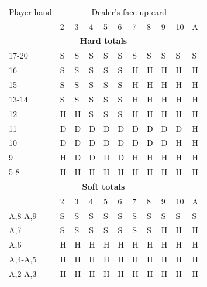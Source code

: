 \documentclass[conference]{IEEEtran}
\begin{document}
\begin{table}[ht]
\tiny
\centering
\begin{tabular}{|l|l|l|l|l|l|l|l|l|l|l|}
\hline

{Player hand} & \multicolumn{10}{c|}{Dealer's face-up card}     \\ \cline{2-11} 
                             & 2 & 3 & 4 & 5 & 6 & 7 & 8 & 9 & 10 & A \\ \hline
\multicolumn{11}{|c|}{\textbf{Hard totals}}                           \\ \hline
17-20       								 & S & S & S & S & S & S & S & S & S & S  \\ \hline
16                           & S & S & S & S & S & H & H & H & H & H  \\ \hline
15                           & S & S & S & S & S & H & H & H & H & H  \\ \hline
13-14                        & S & S & S & S & S & H & H & H & H & H  \\ \hline
12                           & H & H & S & S & S & H & H & H & H & H  \\ \hline
11                           & D & D & D & D & D & D & D & D & D & H  \\ \hline
10                           & D & D & D & D & D & D & D & D & H & H  \\ \hline
9                            & H & D & D & D & D & H & H & H & H & H  \\ \hline
5-8                          & H & H & H & H & H & H & H & H & H & H  \\ \hline

\multicolumn{11}{|c|}{\textbf{Soft totals}}                           \\ \hline
                             & 2 & 3 & 4 & 5 & 6 & 7 & 8 & 9 & 10 & A \\ \hline
A,8-A,9                      & S & S & S & S & S & S & S & S & S & S  \\ \hline
A,7                          & S & S & S & S & S & S & S & H & H & H  \\ \hline
A,6                          & H & H & H & H & H & H & H & H & H & H  \\ \hline
A,4-A,5                      & H & H & H & H & H & H & H & H & H & H  \\ \hline
A,2-A,3                      & H & H & H & H & H & H & H & H & H & H  \\ \hline


\end{tabular}
\end{table}
\end{document}
